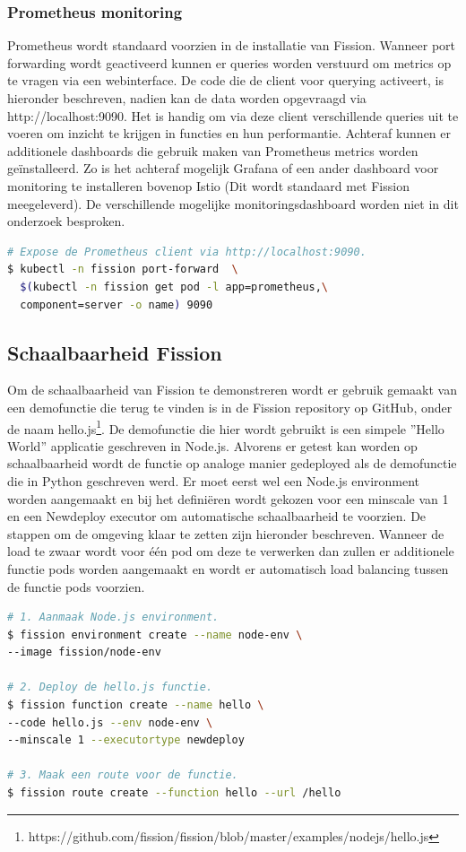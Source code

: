 \subsubsection{Prometheus monitoring}
Prometheus wordt standaard voorzien in de installatie van Fission. Wanneer port forwarding wordt geactiveerd kunnen er queries worden verstuurd om metrics op te vragen via een webinterface. De code die de client voor querying activeert, is hieronder beschreven, nadien kan de data worden opgevraagd via http://localhost:9090. Het is handig om via deze client verschillende queries uit te voeren om inzicht te krijgen in functies en hun performantie. Achteraf kunnen er additionele dashboards die gebruik maken van Prometheus metrics worden geïnstalleerd. Zo is het achteraf mogelijk Grafana of een ander dashboard voor monitoring te installeren bovenop Istio (Dit wordt standaard met Fission meegeleverd). De verschillende mogelijke monitoringsdashboard worden niet in dit onderzoek besproken.

\begin{lstlisting}[language=bash]
# Expose de Prometheus client via http://localhost:9090.
$ kubectl -n fission port-forward  \ 
  $(kubectl -n fission get pod -l app=prometheus,\
  component=server -o name) 9090
\end{lstlisting}

\subsection{Schaalbaarheid Fission}
Om de schaalbaarheid van Fission te demonstreren wordt er gebruik gemaakt van een demofunctie die terug te vinden is in de Fission repository op GitHub, onder de naam hello.js\footnote{https://github.com/fission/fission/blob/master/examples/nodejs/hello.js}. De demofunctie die hier wordt gebruikt is een simpele ''Hello World'' applicatie geschreven in Node.js. Alvorens er getest kan worden op schaalbaarheid wordt de functie op analoge manier gedeployed als de demofunctie die in Python geschreven werd. Er moet eerst wel een Node.js environment worden aangemaakt en bij het definiëren wordt gekozen voor een minscale van 1 en een Newdeploy executor om automatische schaalbaarheid te voorzien. De stappen om de omgeving klaar te zetten zijn hieronder beschreven. Wanneer de load te zwaar wordt voor één pod om deze te verwerken dan zullen er additionele functie pods worden aangemaakt en wordt er automatisch load balancing tussen de functie pods voorzien.

\begin{lstlisting}[language=bash]
# 1. Aanmaak Node.js environment.
$ fission environment create --name node-env \
--image fission/node-env

# 2. Deploy de hello.js functie.
$ fission function create --name hello \
--code hello.js --env node-env \
--minscale 1 --executortype newdeploy

# 3. Maak een route voor de functie.
$ fission route create --function hello --url /hello
\end{lstlisting}

